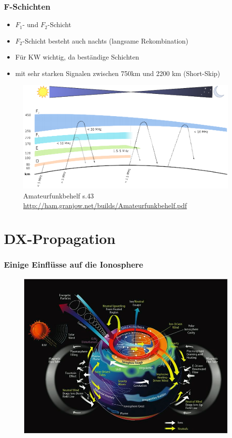 \begin{frame}
  \frametitle{F-Schichten}
  \begin{itemize}
    \item $F_1$- und $F_2$-Schicht
    \item $F_2$-Schicht besteht auch nachts (langsame Rekombination)
    \item Für KW wichtig, da beständige Schichten
    \item mit sehr starken Signalen zwischen 750km und 2200 km (Short-Skip)
  \end{itemize}
  \begin{center}
    \begin{figure}
      \includegraphics[width=.8\textwidth,height=.4\textheight,keepaspectratio]{e09/schichten_behelf_43.png}
      \caption{Amateurfunkbehelf s.43 \ExternalLink \url{http://ham.granjow.net/builds/Amateurfunkbehelf.pdf}}
    \end{figure}
  \end{center}
\end{frame}

\section*{DX-Propagation}

\begin{frame}
  \frametitle{Einige Einflüsse auf die Ionosphere}
  \begin{center}
    \begin{figure}
      \includegraphics[width=.8\textwidth,height=.75\textheight,keepaspectratio]{e09/Ionosphere-Thermosphere_Processes.jpg}
    \end{figure}
  \end{center}
\end{frame}

